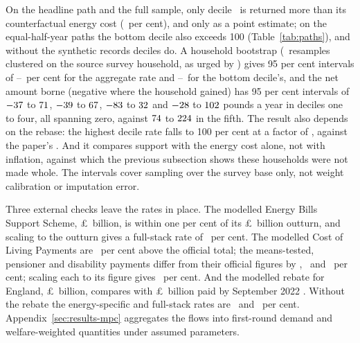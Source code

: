 On the headline path and the full sample, only decile
\SsDecilesAboveHundredList\ is returned more than its counterfactual
energy cost (\SsGridPaperFullMaxDecilePct\ per cent), and only as a
point estimate; on the equal-half-year paths the bottom decile also
exceeds 100 (Table~\ref{tab:paths}), and without the synthetic
records \numword{\SsNoSynDecilesAboveHundred} deciles do. A household bootstrap (\SsBootReps\ resamples clustered on
the source survey household, as urged by \citealp{goedeme2013}) gives
95 per cent intervals of \SsRateLo--\SsRateHi\ per cent for the aggregate rate and
\SsCushionDecOneLo--\SsCushionDecOneHi\ for the bottom decile's,
and the net amount borne (negative where the household gained) has 95 per cent
intervals of $-37$ to $71$, $-39$ to
$67$, $-83$ to $32$ and
$-28$ to $102$ pounds a year in deciles one
to four, all spanning zero, against $74$ to
$224$ in the fifth. The result also depends on the
rebase: the highest decile rate falls to 100 per cent at a factor of
\SsGridMaxDecileRebaseAtHundred, against the paper's \SsRebaseFactor.
And it compares support with the energy cost alone, not with
inflation, against which the previous subsection shows these
households were not made whole. The intervals cover sampling over the
survey base only, not weight calibration or imputation error.

Three external checks leave the rates in place. The modelled Energy
Bills Support Scheme, \pounds\SsEbssBn\ billion, is within one per
cent of its \pounds\SsEbssOutturnBn\ billion outturn, and scaling to
the outturn gives a full-stack rate of \SsCalFullRatePct\ per cent.
The modelled Cost of Living Payments are \SsColOutturnTotalExcessPct\
per cent above the official total; the means-tested, pensioner and
disability payments differ from their official figures by
\SsColOutturnMtExcessPct, \SsColOutturnPenExcessPct\ and
\SsColOutturnDisExcessPct\ per cent;
scaling each to its figure gives \SsColOutturnCalFullRatePct\ per
cent. And the modelled rebate for England,
\pounds\SsCtrEnglandBn\ billion, compares with
\pounds\SsCtrOutturnEnglandBn\ billion paid by September 2022
\citep{dluhcctr}. Without the rebate the energy-specific and
full-stack rates are \SsNoCtrEnergySpecificRatePct\ and
\SsNoCtrDiscretionaryRatePct\ per cent. Appendix~\ref{sec:results-mpc}
aggregates the flows into first-round demand and welfare-weighted
quantities under assumed parameters.

